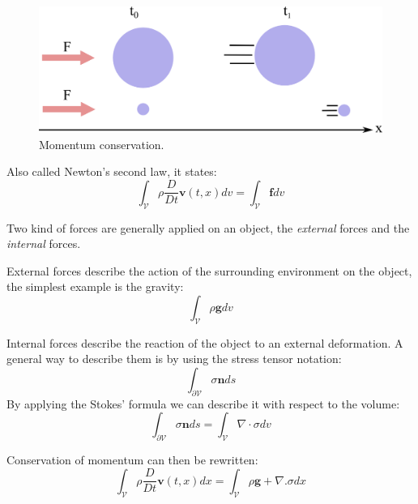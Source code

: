 \begin{figure}[!ht]
\centering
\includegraphics[scale=1.5]{images/continuum_mechanics/momentumConservation.png}
\caption[STAR mechanics: Momentum conservation]{\label{fig:momentumConservation} Momentum conservation.}
\end{figure}

Also called Newton's second law, it states:
\begin{equation}
\label{eq:momentumConservation}
\displaystyle \int_{\mathcal{V}} \rho \frac{D}{Dt} \mathbf{v}(t,x) dv = \int_{\mathcal{V}} \mathbf{f} dv
\end{equation}

Two kind of forces are generally applied on an object, the \emph{external} forces and the \emph{internal} forces.

External forces describe the action of the surrounding environment on the object, the simplest example is the gravity:
\begin{equation}
\displaystyle \int_{\mathcal{V}} \rho \mathbf{g} dv
\end{equation}

Internal forces describe the reaction of the object to an external deformation. A general way to describe them is by using the stress tensor notation:
\begin{equation}
\displaystyle \int_{\partial \mathcal{V}} \sigma \mathbf{n} ds
\end{equation}
By applying the Stokes' formula we can describe it with respect to the volume:
\begin{equation}
\displaystyle 
\int_{\mathcal{\partial V}} \sigma \mathbf{n} ds =
\int_{\mathcal{V}} \nabla \cdot \sigma dv
\end{equation}

Conservation of momentum can then be rewritten:
\begin{equation}
\displaystyle
\int_{\mathcal{V}} \rho \frac{D}{Dt} \mathbf{v}(t,x) dx = \int_{\mathcal{V}} \rho \mathbf{g} + \nabla. \sigma dx
\end{equation}

